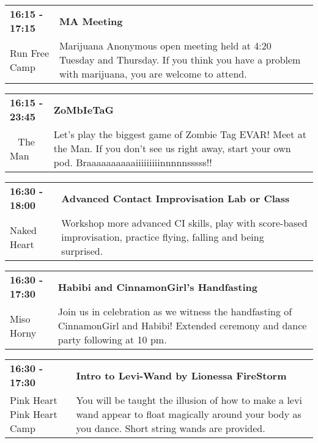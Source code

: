 \begin{tabular}{ p{1in} p{2.2in} }
    \textbf{16:15 - 17:15} & \textbf{MA Meeting} \\
    Run Free Camp \newline  & Marijuana Anonymous open meeting held at 4:20 Tuesday and Thursday. If you think you have a problem with marijuana, you are welcome to attend. \\
    \hline 
\end{tabular}
    
\begin{tabular}{ p{1in} p{2.2in} }
    \textbf{16:15 - 23:45} & \textbf{ZoMbIeTaG} \\
    ~ \newline The Man & Let's play the biggest game of Zombie Tag EVAR! Meet at the Man. If you don't see us right away, start your own pod. Braaaaaaaaaaiiiiiiiiinnnnnsssss!! \\
    \hline 
\end{tabular}
    
\begin{tabular}{ p{1in} p{2.2in} }
    \textbf{16:30 - 18:00} & \textbf{Advanced Contact Improvisation Lab or Class} \\
    Naked Heart \newline  & Workshop more advanced CI skills, play with score-based improvisation, practice flying, falling and being surprised. \\
    \hline 
\end{tabular}
    
\begin{tabular}{ p{1in} p{2.2in} }
    \textbf{16:30 - 17:30} & \textbf{Habibi and CinnamonGirl's Handfasting} \\
    Miso Horny \newline  & Join us in celebration as we witness the handfasting of CinnamonGirl and Habibi! Extended ceremony and dance party following at 10 pm. \\
    \hline 
\end{tabular}
    
\begin{tabular}{ p{1in} p{2.2in} }
    \textbf{16:30 - 17:30} & \textbf{Intro to Levi-Wand by Lionessa FireStorm} \\
    Pink Heart \newline Pink Heart Camp  & You will be taught the illusion of how to make a levi wand appear to float magically around your body as you dance. Short string wands are provided. \\
    \hline 
\end{tabular}
    
